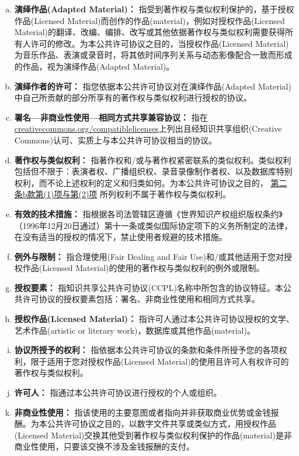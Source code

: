 \begin{enumerate}[a.]
    \item \textbf{演绎作品(Adapted Material)：} 指受到著作权与类似权利保护的，基于授权作品(Licensed Material)而创作的作品(material)，例如对授权作品(Licensed Material)的翻译、改编、编排、改写或其他依据著作权与类似权利需要获得所有人许可的修改。为本公共许可协议之目的，当授权作品(Licensed Material)为音乐作品、表演或录音时，将其依时间序列关系与动态影像配合一致而形成的作品，视为演绎作品(Adapted Material)。\label{entry:A.1.a}
    \item \textbf{演绎作者的许可：} 指您依据本公共许可协议对在演绎作品(Adapted Material)中自己所贡献的部分所享有的著作权与类似权利进行授权的协议。\label{entry:A.1.b}
    \item \textbf{署名—非商业性使用—相同方式共享兼容协议：} 指在\url{creativecommons.org/compatiblelicenses}上列出且经知识共享组织(Creative Commons)认可、实质上与本公共许可协议相当的协议。\label{entry:A.1.c}
    \item \textbf{著作权与类似权利：} 指著作权和/或与著作权紧密联系的类似权利。类似权利包括但不限于：表演者权、广播组织权、录音录像制作者权、以及数据库特别权利，而不论上述权利的定义和归类如何。为本公共许可协议之目的， \hyperref[entry:A.2.b]{第二条b款第(1)项与第(2)项} 所列权利不属于著作权与类似权利。\label{entry:A.1.d}
    \item \textbf{有效的技术措施：} 指根据各司法管辖区遵循《世界知识产权组织版权条约》（1996年12月20日通过）第十一条或类似国际协定项下的义务所制定的法律，在没有适当的授权的情况下，禁止使用者规避的技术措施。\label{entry:A.1.e}
    \item \textbf{例外与限制：} 指合理使用(Fair Dealing and Fair Use)和/或其他适用于您对授权作品(Licensed Material)的使用的著作权与类似权利的例外或限制。\label{entry:A.1.f}
    \item \textbf{授权要素：} 指知识共享公共许可协议(CCPL)名称中所包含的协议特征。本公共许可协议的授权要素包括：署名、非商业性使用和相同方式共享。\label{entry:A.1.g}
    \item \textbf{授权作品(Licensed Material)：} 指许可人通过本公共许可协议授权的文学、艺术作品(artistic or literary work)，数据库或其他作品(material)。\label{entry:A.1.h}
    \item \textbf{协议所授予的权利：} 指依据本公共许可协议的条款和条件所授予您的各项权利，限于适用于您对授权作品(Licensed Material)的使用且许可人有权许可的著作权与类似权利。\label{entry:A.1.i}
    \item \textbf{许可人：} 指通过本公共许可协议进行授权的个人或组织。\label{entry:A.1.j}
    \item \textbf{非商业性使用：} 指该使用的主要意图或者指向并非获取商业优势或金钱报酬。为本公共许可协议之目的，以数字文件共享或类似方式，用授权作品(Licensed Material)交换其他受到著作权与类似权利保护的作品(material)是非商业性使用，只要该交换不涉及金钱报酬的支付。\label{entry:A.1.k}

\end{enumerate}
